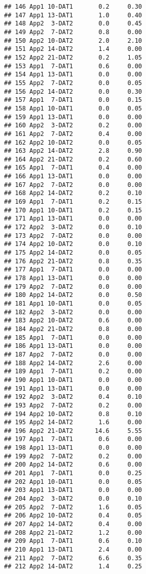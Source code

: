\documentclass[
]{article}
\begin{document}
\begin{verbatim}
## 146 App1 10-DAT1       0.2     0.30
## 147 App1 13-DAT1       1.0     0.40
## 148 App2  3-DAT2       0.0     0.45
## 149 App2  7-DAT2       0.8     0.00
## 150 App2 10-DAT2       2.0     2.10
## 151 App2 14-DAT2       1.4     0.00
## 152 App2 21-DAT2       0.2     1.05
## 153 App1  7-DAT1       0.6     0.00
## 154 App1 13-DAT1       0.0     0.00
## 155 App2  7-DAT2       0.0     0.05
## 156 App2 14-DAT2       0.0     0.30
## 157 App1  7-DAT1       0.0     0.15
## 158 App1 10-DAT1       0.0     0.05
## 159 App1 13-DAT1       0.0     0.00
## 160 App2  3-DAT2       0.2     0.00
## 161 App2  7-DAT2       0.4     0.00
## 162 App2 10-DAT2       0.0     0.05
## 163 App2 14-DAT2       2.8     0.90
## 164 App2 21-DAT2       0.2     0.60
## 165 App1  7-DAT1       0.4     0.00
## 166 App1 13-DAT1       0.0     0.00
## 167 App2  7-DAT2       0.0     0.00
## 168 App2 14-DAT2       0.2     0.10
## 169 App1  7-DAT1       0.2     0.15
## 170 App1 10-DAT1       0.2     0.15
## 171 App1 13-DAT1       0.0     0.00
## 172 App2  3-DAT2       0.0     0.10
## 173 App2  7-DAT2       0.0     0.00
## 174 App2 10-DAT2       0.0     0.10
## 175 App2 14-DAT2       0.0     0.05
## 176 App2 21-DAT2       0.8     0.35
## 177 App1  7-DAT1       0.0     0.00
## 178 App1 13-DAT1       0.0     0.00
## 179 App2  7-DAT2       0.0     0.00
## 180 App2 14-DAT2       0.0     0.50
## 181 App1 10-DAT1       0.0     0.05
## 182 App2  3-DAT2       0.0     0.00
## 183 App2 10-DAT2       0.6     0.00
## 184 App2 21-DAT2       0.8     0.00
## 185 App1  7-DAT1       0.0     0.00
## 186 App1 13-DAT1       0.0     0.00
## 187 App2  7-DAT2       0.0     0.00
## 188 App2 14-DAT2       2.6     0.00
## 189 App1  7-DAT1       0.2     0.00
## 190 App1 10-DAT1       0.0     0.00
## 191 App1 13-DAT1       0.0     0.00
## 192 App2  3-DAT2       0.4     0.10
## 193 App2  7-DAT2       0.2     0.00
## 194 App2 10-DAT2       0.8     0.10
## 195 App2 14-DAT2       1.6     0.00
## 196 App2 21-DAT2      14.6     5.55
## 197 App1  7-DAT1       0.6     0.00
## 198 App1 13-DAT1       0.0     0.00
## 199 App2  7-DAT2       0.2     0.00
## 200 App2 14-DAT2       0.6     0.00
## 201 App1  7-DAT1       0.0     0.25
## 202 App1 10-DAT1       0.0     0.05
## 203 App1 13-DAT1       0.0     0.00
## 204 App2  3-DAT2       0.0     0.10
## 205 App2  7-DAT2       1.6     0.05
## 206 App2 10-DAT2       0.4     0.05
## 207 App2 14-DAT2       0.4     0.00
## 208 App2 21-DAT2       1.2     0.00
## 209 App1  7-DAT1       0.6     0.10
## 210 App1 13-DAT1       2.4     0.00
## 211 App2  7-DAT2       6.6     0.35
## 212 App2 14-DAT2       1.4     0.25

\end{verbatim}
\end{document}
